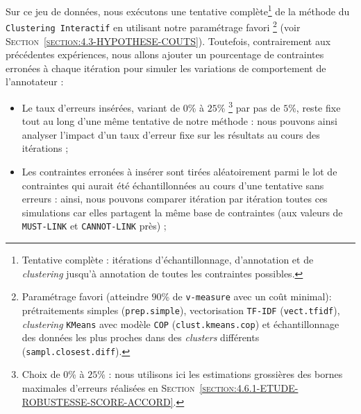 			Sur ce jeu de données, nous exécutons une tentative complète\footnote{
				Tentative complète : itérations d'échantillonnage, d'annotation et de \textit{clustering} jusqu'à annotation de toutes les contraintes possibles.
			} de la méthode du \texttt{Clustering Interactif} en utilisant notre paramétrage favori \footnote{
				Paramétrage favori (atteindre $90$\% de \texttt{v-measure} avec un coût minimal): prétraitements simples (\texttt{prep.simple}), vectorisation \texttt{TF-IDF} (\texttt{vect.tfidf}), \textit{clustering} \texttt{KMeans} avec modèle \texttt{COP} (\texttt{clust.kmeans.cop}) et échantillonnage des données les plus proches dans des \textit{clusters} différents (\texttt{sampl.closest.diff}).
			} (voir \textsc{Section~\ref{section:4.3-HYPOTHESE-COUTS}}).
			Toutefois, contrairement aux précédentes expériences, nous allons ajouter un pourcentage de contraintes erronées à chaque itération pour simuler les variations de comportement de l'annotateur :
			\begin{itemize}
				\item Le taux d'erreurs insérées, variant de $0$\% à $25$\% \footnote{
					Choix de $0$\% à $25$\% : nous utilisons ici les estimations grossières des bornes maximales d'erreurs réalisées en \textsc{Section~\ref{section:4.6.1-ETUDE-ROBUSTESSE-SCORE-ACCORD}}.
				} par pas de $5$\%, reste fixe tout au long d'une même tentative de notre méthode : nous pouvons ainsi analyser l'impact d'un taux d'erreur fixe sur les résultats au cours des itérations ;
				\item Les contraintes erronées à insérer sont tirées aléatoirement parmi le lot de contraintes qui aurait été échantillonnées au cours d'une tentative sans erreurs : ainsi, nous pouvons comparer itération par itération toutes ces simulations car elles partagent la même base de contraintes (aux valeurs de \texttt{MUST-LINK} et \texttt{CANNOT-LINK} près) ;
			\end{itemize}
			
